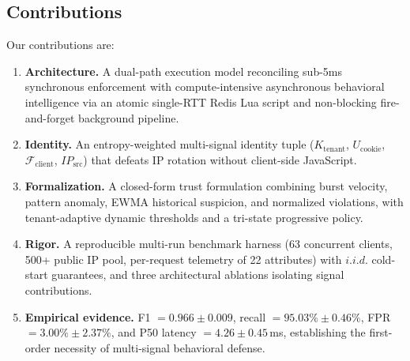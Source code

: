 \documentclass[journal,10pt]{IEEEtran}
\newcommand{\Fclient}{\mathcal{F}_{\mathrm{client}}}
\newcommand{\Ktenant}{K_{\mathrm{tenant}}}
\newcommand{\Ucookie}{U_{\mathrm{cookie}}}
\newcommand{\ip}{IP_{\mathrm{src}}}
\begin{document}
\subsection{Contributions}
Our contributions are:
\begin{enumerate}
    \item \textbf{Architecture.} A dual-path execution model reconciling sub-5ms synchronous enforcement with compute-intensive asynchronous behavioral intelligence via an atomic single-RTT Redis Lua script and non-blocking fire-and-forget background pipeline.
    \item \textbf{Identity.} An entropy-weighted multi-signal identity tuple ($\Ktenant$, $\Ucookie$, $\Fclient$, $\ip$) that defeats IP rotation without client-side JavaScript.
    \item \textbf{Formalization.} A closed-form trust formulation combining burst velocity, pattern anomaly, EWMA historical suspicion, and normalized violations, with tenant-adaptive dynamic thresholds and a tri-state progressive policy.
    \item \textbf{Rigor.} A reproducible multi-run benchmark harness (63 concurrent clients, 500+ public IP pool, per-request telemetry of 22 attributes) with $i.i.d.$ cold-start guarantees, and three architectural ablations isolating signal contributions.
    \item \textbf{Empirical evidence.} F1 $=0.966\pm0.009$, recall $=95.03\%\pm0.46\%$, FPR $=3.00\%\pm2.37\%$, and P50 latency $=4.26\pm0.45$\,ms, establishing the first-order necessity of multi-signal behavioral defense.
\end{enumerate}
\end{document}
